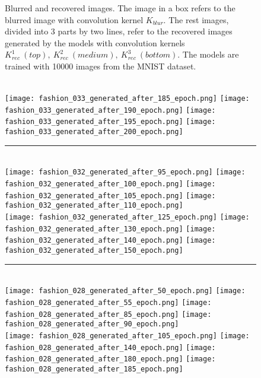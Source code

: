 \documentclass{article}
\begin{document}
\begin{figure}[!h]
\caption{Blurred and recovered images. The image in a box refers to the blurred image with convolution kernel $K_{blur}$. The rest images, divided into 3 parts by two lines, refer to the recovered images generated by the models with convolution kernels $K_{rec}^1\ (top),\ K_{rec}^2\ (medium),\ K_{rec}^3\ (bottom)$. The models are trained with 10000 images from the MNIST dataset.}
\label{recovery}
\end{figure}


\begin{figure}[!h]
\centering
{}
\\
{
\texttt{[image: fashion\_033\_generated\_after\_185\_epoch.png]}
}
{
\texttt{[image: fashion\_033\_generated\_after\_190\_epoch.png]}
}
{
\texttt{[image: fashion\_033\_generated\_after\_195\_epoch.png]}
}
{
\texttt{[image: fashion\_033\_generated\_after\_200\_epoch.png]}
}

\rule{0.8\textwidth}{0.3mm}\\{
\texttt{[image: fashion\_032\_generated\_after\_95\_epoch.png]}
}{
\texttt{[image: fashion\_032\_generated\_after\_100\_epoch.png]}
}{
\texttt{[image: fashion\_032\_generated\_after\_105\_epoch.png]}
}{
\texttt{[image: fashion\_032\_generated\_after\_110\_epoch.png]}
}
\\
{
\texttt{[image: fashion\_032\_generated\_after\_125\_epoch.png]}
}
{
\texttt{[image: fashion\_032\_generated\_after\_130\_epoch.png]}
}
{
\texttt{[image: fashion\_032\_generated\_after\_140\_epoch.png]}
}
{
\texttt{[image: fashion\_032\_generated\_after\_150\_epoch.png]}
}

\rule{0.8\textwidth}{0.3mm}\\{
\texttt{[image: fashion\_028\_generated\_after\_50\_epoch.png]}
}{
\texttt{[image: fashion\_028\_generated\_after\_55\_epoch.png]}
}{
\texttt{[image: fashion\_028\_generated\_after\_85\_epoch.png]}
}{
\texttt{[image: fashion\_028\_generated\_after\_90\_epoch.png]}
}
\\
{
\texttt{[image: fashion\_028\_generated\_after\_105\_epoch.png]}
}
{
\texttt{[image: fashion\_028\_generated\_after\_140\_epoch.png]}
}
{
\texttt{[image: fashion\_028\_generated\_after\_180\_epoch.png]}
}
{
\texttt{[image: fashion\_028\_generated\_after\_185\_epoch.png]}
}


\end{figure}
\end{document}
